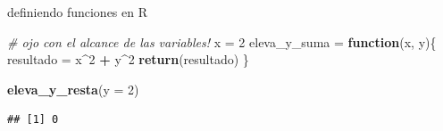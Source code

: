 \documentclass[ignorenonframetext,]{beamer}
\newenvironment{Shaded}{\begin{snugshade}}{\end{snugshade}}
\newcommand{\CommentTok}[1]{\textcolor[rgb]{0.56,0.35,0.01}{\textit{#1}}}
\newcommand{\ControlFlowTok}[1]{\textcolor[rgb]{0.13,0.29,0.53}{\textbf{#1}}}
\newcommand{\DataTypeTok}[1]{\textcolor[rgb]{0.13,0.29,0.53}{#1}}
\newcommand{\DecValTok}[1]{\textcolor[rgb]{0.00,0.00,0.81}{#1}}
\newcommand{\KeywordTok}[1]{\textcolor[rgb]{0.13,0.29,0.53}{\textbf{#1}}}
\newcommand{\NormalTok}[1]{#1}
\newcommand{\OperatorTok}[1]{\textcolor[rgb]{0.81,0.36,0.00}{\textbf{#1}}}
\newcommand{\StringTok}[1]{\textcolor[rgb]{0.31,0.60,0.02}{#1}}
\begin{document}
\begin{frame}[fragile]{definiendo funciones en R}
\protect\hypertarget{definiendo-funciones-en-r-6}{}

\begin{Shaded}
\begin{Highlighting}[]
\CommentTok{# ojo con el alcance de las variables!}
\NormalTok{x =}\StringTok{ }\DecValTok{2}
\NormalTok{eleva_y_suma =}\StringTok{ }\ControlFlowTok{function}\NormalTok{(x, y)\{}
\NormalTok{  resultado =}\StringTok{ }\NormalTok{x}\OperatorTok{^}\DecValTok{2} \OperatorTok{+}\StringTok{ }\NormalTok{y}\OperatorTok{^}\DecValTok{2}
  \KeywordTok{return}\NormalTok{(resultado)}
\NormalTok{\}}

\KeywordTok{eleva_y_resta}\NormalTok{(}\DataTypeTok{y =} \DecValTok{2}\NormalTok{)}
\end{Highlighting}
\end{Shaded}

\begin{verbatim}
## [1] 0
\end{verbatim}

\end{frame}
\end{document}
